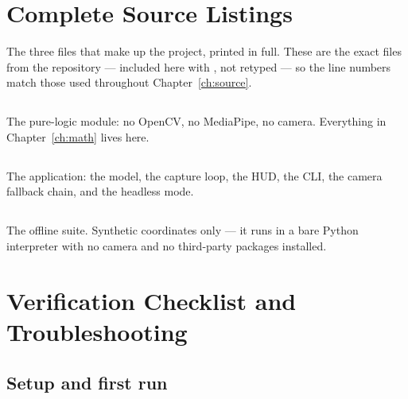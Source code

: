 \appendix

\chapter{Complete Source Listings}
\label{app:source}

The three files that make up the project, printed in full. These are the exact files from the
repository --- included here with , not retyped --- so the line
numbers match those used throughout Chapter~\ref{ch:source}.

\section{}

The pure-logic module: no OpenCV, no MediaPipe, no camera. Everything in
Chapter~\ref{ch:math} lives here.



\clearpage
\section{}

The application: the model, the capture loop, the HUD, the CLI, the camera fallback chain, and the
headless  mode.



\clearpage
\section{}

The offline suite. Synthetic coordinates only --- it runs in a bare Python interpreter with no
camera and no third-party packages installed.



\chapter{Verification Checklist and Troubleshooting}
\label{app:verify}

\section{Setup and first run}

